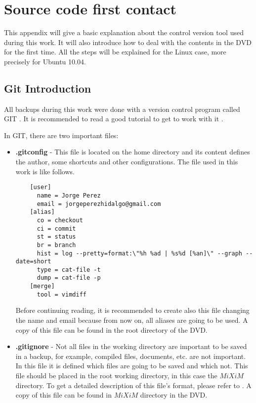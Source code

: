 \appendix
\chapter{Source code first contact}
\label{chap:installation}

This appendix will give a basic explanation about the control version tool used during this work. It will also introduce how to deal with 
the contents in the \ac{DVD} for the first time. All the steps will be explained for the Linux case, more precisely for Ubuntu 10.04.

\section{Git Introduction}

All backups during this work were done with a version control program called GIT \cite{git}. It is recommended to read a good tutorial to get
to work with it \cite{manualgit}.

In GIT, there are two important files:

\begin{itemize}
  \item \textbf{.gitconfig} - This file is located on the home directory and its content defines the author, some shortcuts and other configurations.
  The file used in this work is like follows.
  \begin{verbatim}
    [user]
      name = Jorge Perez
      email = jorgeperezhidalgo@gmail.com
    [alias]
      co = checkout
      ci = commit
      st = status
      br = branch
      hist = log --pretty=format:\"%h %ad | %s%d [%an]\" --graph --date=short
      type = cat-file -t
      dump = cat-file -p
    [merge]
      tool = vimdiff
  \end{verbatim}

  Before continuing reading, it is recommended to create also this file changing the name and email because from now on, all aliases are going to
  be used. A copy of this file can be found in the root directory of the \ac{DVD}.

  \item \textbf{.gitignore} - Not all files in the working directory are important to be saved in a backup, for example, compiled files, documents, 
  etc. are not important. In this file it is defined which files are going to be saved and which not. This file should be placed in the root working
  directory, in this case the $MiXiM$ directory. To get a detailed description of this file's format, please refer to \cite{manualgit}. A copy of 
  this file can be found in $MiXiM$ directory in the \ac{DVD}.
  
\end{itemize}


